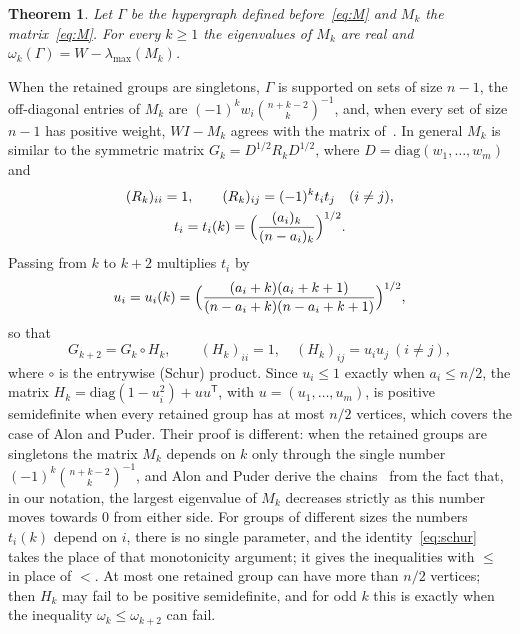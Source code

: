 \documentclass[11pt]{amsart}
\newtheorem{thm}{Theorem}[section]
\theoremstyle{remark}
\numberwithin{equation}{section}
\begin{document}
\begin{thm}\label{thm:reduction}
Let $\Gamma$ be the hypergraph defined before~\eqref{eq:M} and $M_k$ the matrix~\eqref{eq:M}. For every $k\ge1$ the eigenvalues of $M_k$ are real and $\omega_k(\Gamma)=W-\lambda_{\max}(M_k)$.
\end{thm}

When the retained groups are singletons, $\Gamma$ is supported on sets of size $n-1$, the off-diagonal entries of $M_k$ are $(-1)^kw_i\binom{n+k-2}{k}^{-1}$, and, when every set of size $n-1$ has positive weight, $WI-M_k$ agrees with the matrix of~\cite[Proposition~4.8]{AP26}. In general $M_k$ is similar to the symmetric matrix $G_k=D^{1/2}R_kD^{1/2}$, where $D=\mathrm{diag}(w_1,\dots,w_m)$ and
\begin{equation}\label{eq:R}
\begin{gathered}(R_k)_{ii}=1,\qquad (R_k)_{ij}=(-1)^kt_it_j\quad(i\ne j),\\ t_i=t_i(k)=\Bigl(\frac{(a_i)_k}{(n-a_i)_k}\Bigr)^{1/2}.\end{gathered}
\end{equation}
Passing from $k$ to $k+2$ multiplies $t_i$ by
\begin{equation}\label{eq:u}
u_i=u_i(k)=\Bigl(\frac{(a_i+k)(a_i+k+1)}{(n-a_i+k)(n-a_i+k+1)}\Bigr)^{1/2},
\end{equation}
so that
\begin{equation}\label{eq:schur}
G_{k+2}=G_k\circ H_k,\qquad (H_k)_{ii}=1,\quad (H_k)_{ij}=u_iu_j\ (i\ne j),
\end{equation}
where $\circ$ is the entrywise (Schur) product. Since $u_i\le1$ exactly when $a_i\le n/2$, the matrix $H_k=\mathrm{diag}(1-u_i^2)+uu^{\mathsf T}$, with $u=(u_1,\dots,u_m)$, is positive semidefinite when every retained group has at most $n/2$ vertices, which covers the case of Alon and Puder. Their proof is different: when the retained groups are singletons the matrix $M_k$ depends on $k$ only through the single number $(-1)^k\binom{n+k-2}{k}^{-1}$, and Alon and Puder derive the chains~\cite[\S4.1]{AP26} from the fact that, in our notation, the largest eigenvalue of $M_k$ decreases strictly as this number moves towards $0$ from either side. For groups of different sizes the numbers $t_i(k)$ depend on $i$, there is no single parameter, and the identity~\eqref{eq:schur} takes the place of that monotonicity argument; it gives the inequalities with $\le$ in place of $<$. At most one retained group can have more than $n/2$ vertices; then $H_k$ may fail to be positive semidefinite, and for odd $k$ this is exactly when the inequality $\omega_k\le\omega_{k+2}$ can fail.
\end{document}

